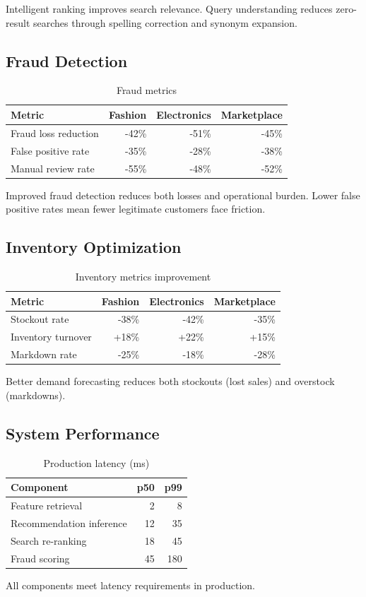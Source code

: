 Intelligent ranking improves search relevance. Query understanding reduces zero-result searches through spelling correction and synonym expansion.

\subsection{Fraud Detection}

\begin{table}[h]
\centering
\caption{Fraud metrics}
\label{tab:fraud}
\begin{tabular}{lrrr}
\hline
Metric & Fashion & Electronics & Marketplace \\
\hline
Fraud loss reduction & -42\% & -51\% & -45\% \\
False positive rate & -35\% & -28\% & -38\% \\
Manual review rate & -55\% & -48\% & -52\% \\
\hline
\end{tabular}
\end{table}

Improved fraud detection reduces both losses and operational burden. Lower false positive rates mean fewer legitimate customers face friction.

\subsection{Inventory Optimization}

\begin{table}[h]
\centering
\caption{Inventory metrics improvement}
\label{tab:inventory}
\begin{tabular}{lrrr}
\hline
Metric & Fashion & Electronics & Marketplace \\
\hline
Stockout rate & -38\% & -42\% & -35\% \\
Inventory turnover & +18\% & +22\% & +15\% \\
Markdown rate & -25\% & -18\% & -28\% \\
\hline
\end{tabular}
\end{table}

Better demand forecasting reduces both stockouts (lost sales) and overstock (markdowns).

\subsection{System Performance}

\begin{table}[h]
\centering
\caption{Production latency (ms)}
\label{tab:prod_latency}
\begin{tabular}{lrr}
\hline
Component & p50 & p99 \\
\hline
Feature retrieval & 2 & 8 \\
Recommendation inference & 12 & 35 \\
Search re-ranking & 18 & 45 \\
Fraud scoring & 45 & 180 \\
\hline
\end{tabular}
\end{table}

All components meet latency requirements in production.

